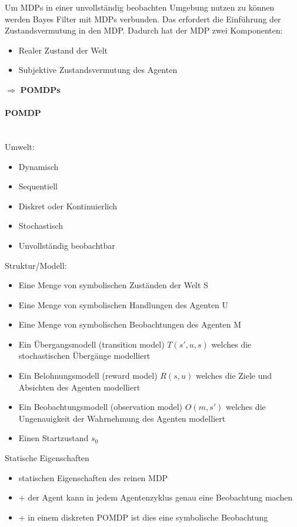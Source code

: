 Um MDPs in einer unvollst\"andig beobachten Umgebung nutzen zu k\"onnen werden Bayes Filter mit MDPs verbunden.
Das erfordert die Einf\"uhrung der Zustandsvermutung in den MDP.
Dadurch hat der MDP zwei Komponenten:
\begin{itemize}
	\item Realer Zustand der Welt
	\item Subjektive Zustandsvermutung des Agenten
\end{itemize}
$\Rightarrow$ \textbf{POMDPs}

\paragraph{POMDP} {\ }\\
Umwelt:
\begin{itemize}
	\item Dynamisch
	\item Sequentiell
	\item Diskret oder Kontinuierlich
	\item Stochastisch
	\item Unvollst\"andig beobachtbar
\end{itemize}

Struktur/Modell:
\begin{itemize}
	\item Eine Menge von symbolischen Zust\"anden der Welt S
	\item Eine Menge von symbolischen Handlungen des Agenten U
	\item Eine Menge von symbolischen Beobachtungen des Agenten M
	\item Ein \"Ubergangsmodell (transition model) $T(s', u, s)$ welches die stochastischen \"Uberg\"ange modelliert
	\item Ein Belohnungsmodell (reward model) $R(s,u)$ welches die Ziele und Absichten des Agenten modelliert
	\item Ein Beobachtungsmodell (observation model) $O(m, s')$ welches die Ungenauigkeit der Wahrnehmung des Agenten modelliert
	\item Einen Startzustand $s_0$
\end{itemize}

Statische Eigenschaften
\begin{itemize}
	\item statischen Eigenschaften des reinen MDP
	\item + der Agent kann in jedem Agentenzyklus genau eine Beobachtung machen
	\item + in einem diskreten POMDP ist dies eine symbolische Beobachtung
\end{itemize}

